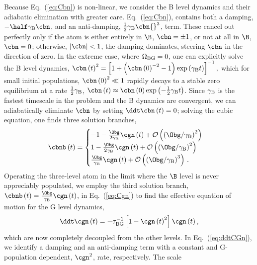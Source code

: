 Because Eq.~(\ref{eq:Cbn}) is non-linear, we consider the B level
dynamics and their adiabatic elimination with greater care. Eq.~(\ref{eq:Cbn}),
contains both a damping, $-\half\gamma_{{\rm B}}\cbn$, and an anti-damping,
$\frac{1}{2}\gamma_{{\rm B}}\cbn{}^{3}$, term. These cancel out perfectly
only if the atom is either entirely in $\B$, $\cbn=\pm1$, or not
at all in $\B$, $\cbn=0$; otherwise, $\left|\cbn\right|<1$, the
damping dominates, steering $\cbn$ in the direction of zero. In the
extreme case, where $\Omega_{{\rm BG}}=0$, one can explicitly solve
the B level dynamics, $\cbn\left(t\right)^{2}=\left[1+\left(\cbn\left(0\right)^{-2}-1\right)\exp\left(\gamma_{{\rm B}}t\right)\right]^{-1},$
which for small initial populations, $\cbn\left(0\right)^{2}\ll1$
rapidly decays to a stable zero equilibrium at a rate $\frac{1}{2}\gamma_{{\rm B}}$,
$\cbn\left(t\right)\approx\cbn\left(0\right)\exp\left(-\frac{1}{2}\gamma_{{\rm B}}t\right)$.
Since $\gamma_{{\rm B}}$ is the fastest timescale in the problem
and the B dynamics are convergent, we can adiabatically eliminate
$\cbn$ by setting $\ddt\cbn\left(t\right)=0$; solving the cubic
equation, one finds three solution branches,
\begin{equation}
\cbnb\left(t\right)=\begin{cases}
-1-\frac{\Obg}{2\gamma_{{\rm B}}}\cgn\left(t\right)+\mathcal{O}\left(\left(\Obg/\gamma_{{\rm B}}\right)^{2}\right)\\
1-\frac{\Obg}{2\gamma_{{\rm B}}}\cgn\left(t\right)+\mathcal{O}\left(\left(\Obg/\gamma_{{\rm B}}\right)^{2}\right)\\
\frac{\Obg}{\gamma_{{\rm B}}}\cgn\left(t\right)+\mathcal{O}\left(\left(\Obg/\gamma_{{\rm B}}\right)^{3}\right)\,.
\end{cases}\label{eq:Cb-bar}
\end{equation}
Operating the three-level atom in the limit where the $\B$ level
is never appreciably populated, we employ the third solution branch,
$\cbnb\left(t\right)=\frac{\Obg}{\gamma_{{\rm B}}}\cgn\left(t\right)$,
in Eq.~(\ref{eq:Cgn}) to find the effective equation of motion for
the G level dynamics, 
\begin{equation}
\ddt\cgn\left(t\right)=-\tau_{\mathrm{BG}}^{-1}\left[1-\cgn\left(t\right)^{2}\right]\cgn\left(t\right),\label{eq:ddtCGn}
\end{equation}
which are now completely decoupled from the other levels. In Eq.~(\ref{eq:ddtCGn}),
we identify a damping and an anti-damping term with a constant and
G-population dependent, $\cgn^{2}$, rate, respectively. The scale
